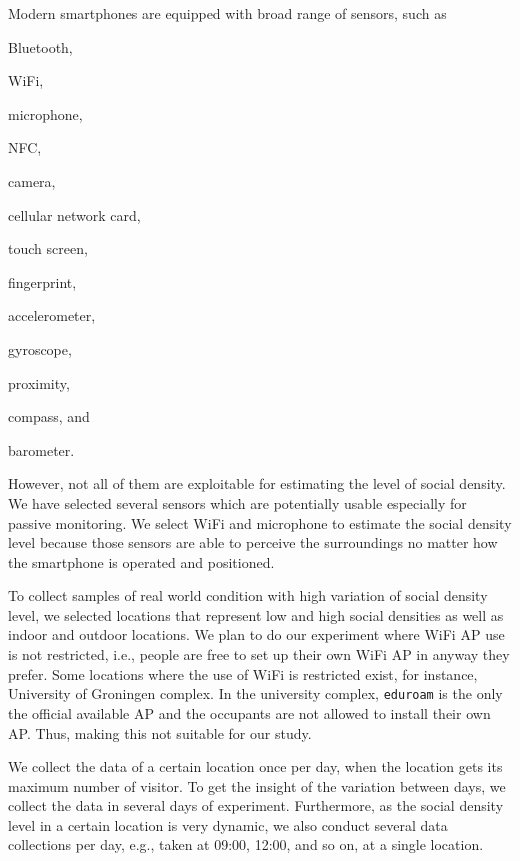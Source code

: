 Modern smartphones are equipped with broad range of sensors, such as
\begin{enumerate*}[label={\alph*)},font={\color{red!50!black}\bfseries}]
  \item Bluetooth,
  \item WiFi,
  \item microphone,
  \item NFC,
  \item camera,
  \item cellular network card,
  \item touch screen,
  \item fingerprint,
  \item accelerometer,
  \item gyroscope,
  \item proximity,
  \item compass, and
  \item barometer.
\end{enumerate*}
However, not all of them are exploitable for estimating the level of social density. We have selected several sensors which are potentially usable especially for passive monitoring. We select WiFi and microphone to estimate the social density level because those sensors are able to perceive the surroundings no matter how the smartphone is operated and positioned.

To collect samples of real world condition with high variation of social density level, we selected locations that represent low and high social densities as well as indoor and outdoor locations. We plan to do our experiment where WiFi \ac{AP} use is not restricted, i.e., people are free to set up their own WiFi \ac{AP} in anyway they prefer. Some locations where the use of WiFi is restricted exist, for instance, University of Groningen complex. In the university complex, \verb|eduroam| is the only the official available \ac{AP} and the occupants are not allowed to install their own \ac{AP}. Thus, making this not suitable for our study.

We collect the data of a certain location once per day, when the location gets its maximum number of visitor. To get the insight of the variation between days, we collect the data in several days of experiment. Furthermore, as the social density level in a certain location is very dynamic, we also conduct several data collections per day, e.g., taken at 09:00, 12:00, and so on, at a single location.


